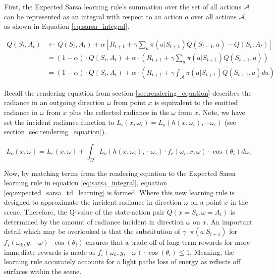 \documentclass[../dissertation.tex]{subfiles}
\begin{document}
First, the Expected Sarsa learning rule's summation over the set of all actions $\mathcal{A}$ can be represented as an integral with respect to an action $a$ over all actions $\mathcal{A}$, as shown in Equation \ref{eq:sarsa_integral}.

\begin{align}
Q(S_t, A_t) & \leftarrow Q(S_t, A_t) + \alpha [R_{t+1} + \gamma \sum_a \pi(a| S_{t+1}) Q(S_{t+1}, a) - Q(S_t, A_t)]\\
& =  (1 - \alpha) \cdot Q(S_{t},A_t) + \alpha \cdot \left( R_{t+1} + \gamma \sum_a \pi(a|S_{t+1}) Q(S_{t+1}, a) \right)\\
& = (1 - \alpha) \cdot Q(S_{t},A_t) + \alpha \cdot \left( R_{t+1} + \gamma \int_\mathcal{A} \pi(a|S_{t+1}) Q(S_{t+1}, a) da \right)
 \label{eq:sarsa_integral}
\end{align}

\noindent
Recall the rendering equation from section \ref{sec:rendering_equation} describes the radiance in an outgoing direction $\omega$ from point $x$ is equivalent to the emitted radiance in $\omega$ from $x$ plus the reflected radiance in the $\omega$ from $x$. Note, we have set the incident radiance function to $L_i(x, \omega_i) = L_o(h(x, \omega_i), -\omega_i)$ (see section \ref{sec:rendering_equation}).

\begin{equation}
L_o(x, \omega) = L_e(x,\omega)  + \int_\Omega L_o(h(x, \omega_i), -\omega_i)  \cdot f_r(\omega_i, x, \omega) \cdot \cos(\theta_i) d\omega_i \nonumber
\end{equation}

\noindent
Now, by matching  terms from the rendering equation to the Expected Sarsa learning rule in equation \ref{eq:sarsa_integral}, equation \ref{eq:expected_sarsa_td_learning} is formed. Where this new learning rule is designed to approximate the incident radiance in direction $\omega$ on a point $x$ in the scene. Therefore, the Q-value of the state-action pair $Q(x = S_t, \omega = A_t)$ is determined by the amount of radiance incident in direction $\omega$ on $x$. An important detail which may be overlooked is that the substitution of $\gamma \cdot \pi(a|S_{t+1})$ for $f_s(\omega_k, y, -\omega) \cdot \cos(\theta_i)$ ensures that a trade off of long term rewards for more immediate rewards is made as $f_s(\omega_k, y, -\omega) \cdot \cos(\theta_i) \leq 1$. Meaning, the learning rule accurately accounts for a light paths loss of energy as reflects off surfaces within the scene.
\end{document}
